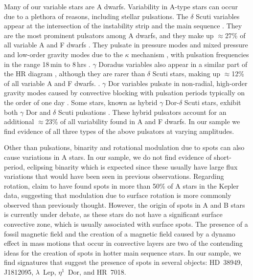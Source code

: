\documentclass[twocolumn]{aastex631}
\begin{document}
Many of our variable stars are A dwarfs.  Variability in A-type stars can occur due to a plethora of reasons, including stellar pulsations.  The $\delta$ Scuti variables appear at the intersection of the instability strip and the main sequence \citep[e.g.,][]{Petit1987}.  They are the most prominent pulsators among A dwarfs, and they make up $\approx$27\% of all variable A and F dwarfs \citep{Uytterhoeven2011}. They pulsate in pressure modes and mixed pressure and low-order gravity modes due to the $\kappa$ mechanism \citep{Lee1985}, with pulsation frequencies in the range 18\,min to 8\,hrs \citep{Amado2004}. $\gamma$ Doradus variables also appear in a similar part of the HR diagram \citep[e.g.,][]{Kaye1999}, although they are rarer than $\delta$ Scuti stars, making up $\approx$12\% of all variable A and F dwarfs. \citep{Uytterhoeven2011}. $\gamma$ Dor variables pulsate in non-radial, high-order gravity modes caused by convective blocking \citep{Guzik2000} with pulsation periods typically on the order of one day \citep{Grigahcene2010}.  Some stars, known as hybrid $\gamma$ Dor-$\delta$ Scuti stars, exhibit both $\gamma$ Dor and $\delta$ Scuti pulsations \citep{Grigahcene2010}.  These hybrid pulsators account for an additional $\approx$23\% of all variability found in A and F dwarfs. In our sample we find evidence of all three types of the above pulsators at varying amplitudes.

Other than pulsations, binarity and rotational modulation due to spots can also cause variations in A stars. In our sample, we do not find evidence of short-period, eclipsing binarity which is expected since these usually have large flux variations that would have been seen in previous observations. Regarding rotation, \citet{Balona2013, Balona2017} claim to have found spots in more than 50\% of A stars in the Kepler data, suggesting that modulation due to surface rotation is more commonly observed than previously thought. However, the origin of spots in A and B stars is currently under debate, as these stars do not have a significant surface convective zone, which is usually associated with surface spots. The presence of a fossil magnetic field \citep{Parker1955} and the creation of a magnetic field caused by a dynamo effect in mass motions that occur in convective layers \citep{Charbonneau2014} are two of the contending ideas for the creation of spots in hotter main sequence stars. In our sample, we find signatures that suggest the presence of spots in several objects:  HD~38949, J1812095, $\lambda$~Lep, $\eta^1$~Dor, and HR~7018.
\end{document}
